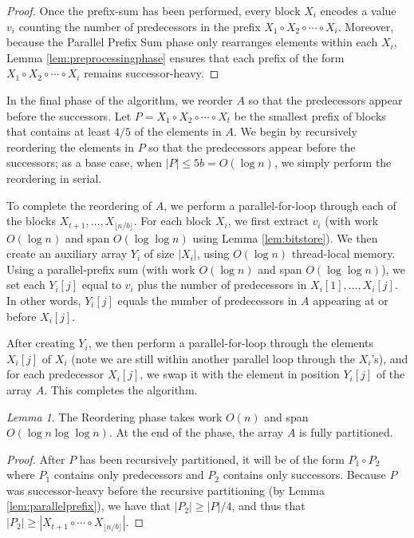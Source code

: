 \documentclass[sigplan, 10pt, nonacm]{acmart}
\renewcommand{\paragraph}[1]{\vspace{0.09in}\noindent{\bf \boldmath #1.}}
\theoremstyle{remark}
\newtheorem{lemma}[thm]{Lemma}
\theoremstyle{remark}
\begin{document}
\begin{appendices}
\begin{proof}
Once the prefix-sum has been performed, every block $X_i$
encodes a value $v_i$ counting the number of predecessors in the
prefix $X_1 \circ X_2 \circ \cdots \circ X_i$. Moreover, because the
Parallel Prefix Sum phase only rearranges elements within each $X_i$,
Lemma \ref{lem:preprocessingphase} ensures that each prefix of the
form $X_1 \circ X_2 \circ \cdots \circ X_i$ remains successor-heavy.
\end{proof}

\paragraph{In-Place Reordering}
In the final phase of the algorithm, we reorder $A$ so that the
predecessors appear before the successors. Let $P = X_1 \circ X_2
\circ \cdots \circ X_t$ be the smallest prefix of blocks that contains
at least $4/5$ of the elements in $A$. We begin by recursively
reordering the elements in $P$ so that the predecessors appear before
the successors; as a base case, when $|P| \le 5b = O(\log n)$, we
simply perform the reordering in serial.

To complete the reordering of $A$, we perform a parallel-for-loop
through each of the blocks $X_{t + 1}, \ldots, X_{\lfloor n / b \rfloor}$. For each block
$X_i$, we first extract $v_i$ (with work $O(\log n)$ and span $O(\log
\log n)$ using Lemma \ref{lem:bitstore}). We then create an auxiliary
array $Y_i$ of size $|X_i|$, using $O(\log n)$ thread-local
memory. Using a parallel-prefix sum (with work $O(\log n)$ and span
$O(\log \log n)$), we set each $Y_i[j]$ equal to $v_i$ plus the number
of predecessors in $X_i[1], \ldots, X_i[j]$. In other words, $Y_i[j]$
equals the number of predecessors in $A$ appearing at or before
$X_i[j]$.

After creating $Y_i$, we then perform a parallel-for-loop through the
elements $X_i[j]$ of $X_i$ (note we are still within another parallel
loop through the $X_i$'s), and for each predecessor $X_i[j]$, we swap
it with the element in position $Y_i[j]$ of the array $A$. This
completes the algorithm.

\begin{lemma}
 The Reordering phase takes work $O(n)$ and span $O(\log n \log \log
 n)$. At the end of the phase, the array $A$ is fully partitioned.
\end{lemma}
\begin{proof}
  After $P$ has been recursively partitioned, it will be of the form
  $P_1 \circ P_2$ where $P_1$ contains only predecessors and $P_2$
  contains only successors. Because $P$ was successor-heavy before the
  recursive partitioning (by Lemma \ref{lem:parallelprefix}), we have
  that $|P_2| \ge |P| / 4$, and thus that
  $|P_2| \ge |X_{t + 1} \circ \cdots \circ X_{\lfloor n / b
    \rfloor}|$.


\end{proof}
\end{appendices}
\end{document}
